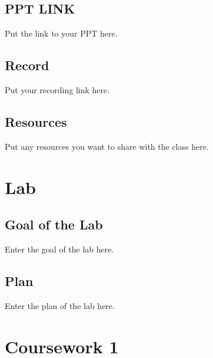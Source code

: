 \documentclass[
  letterpaper,
  oneside]{book}
\numberwithin{equation}{section}
\numberwithin{figure}{section}
\theoremstyle{break}
\begin{document}

\section*{PPT LINK}\label{ppt-link-7}


Put the link to your PPT here.

\section*{Record}\label{record-7}


Put your recording link here.

\section*{Resources}\label{resources-7}


Put any resources you want to share with the class here.

\chapter*{Lab}\label{lab-7}


\section*{Goal of the Lab}\label{goal-of-the-lab-7}


Enter the goal of the lab here.

\section*{Plan}\label{plan-7}


Enter the plan of the lab here.


\chapter*{\texorpdfstring{{Coursework
1}}{Coursework 1}}\label{coursework-1}
\end{document}
